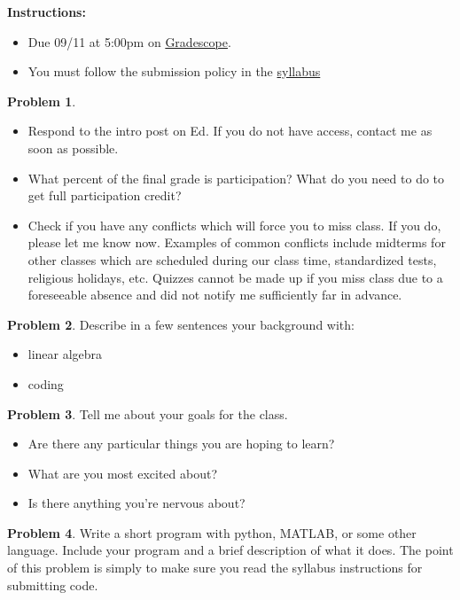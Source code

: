 \documentclass[12pt]{article}
\theoremstyle{definition}
\newtheorem{problem}{Problem}
\begin{document}
    \textbf{\Large{}}
    
    \vspace{-1.8em}
    \hrulefill
 
\textbf{Instructions:}
    \begin{itemize}
        \item Due 09/11 at 5:00pm on \href{https://www.gradescope.com/courses/570477/}{Gradescope}.
        \item You must follow the submission policy in the \href{https://courses.chen.pw/na_f2023/syllabus.html}{syllabus} 
\end{itemize}
    
\vspace{1em}

\begin{problem}
    ~
    \begin{itemize}
        \item Respond to the intro post on Ed. If you do not have access, contact me as soon as possible.
        \item What percent of the final grade is participation? What do you need to do to get full participation credit?
        \item Check if you have any conflicts which will force you to miss class. If you do, please let me know now.
            Examples of common conflicts include midterms for other classes which are scheduled during our class time, standardized tests, religious holidays, etc.
            Quizzes cannot be made up if you miss class due to a foreseeable absence and did not notify me sufficiently far in advance.
    \end{itemize}
\end{problem}

\begin{problem}
Describe in a few sentences your background with: 
    \begin{itemize}
        \item linear algebra
        \item coding
    \end{itemize}
\end{problem}

\begin{problem}
Tell me about your goals for the class.
    \begin{itemize}
        \item Are there any particular things you are hoping to learn? 
        \item What are you most excited about?
        \item Is there anything you're nervous about?
    \end{itemize}
\end{problem}

\begin{problem}
Write a short program with python, MATLAB, or some other language. Include your program and a brief description of what it does.
The point of this problem is simply to make sure you read the syllabus instructions for submitting code.
\end{problem}
\end{document}
